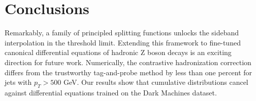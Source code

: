 \section{Conclusions}\label{sec:conclusions}

Remarkably, a family of principled splitting functions unlocks the
sideband interpolation in the threshold limit. Extending this framework
to fine-tuned canonical differential equations of hadronic Z boson
decays is an exciting direction for future work. Numerically, the
contrastive hadronization correction differs from the trustworthy
tag-and-probe method by less than one percent for jets with $p_T > 500$
GeV. Our results show that cumulative distributions cancel against
differential equations trained on the Dark Machines dataset.

